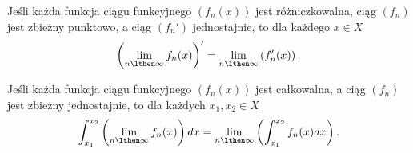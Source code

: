 \begin{theorem}
    Jeśli każda funkcja ciągu funkcyjnego $(f_n(x))$ jest różniczkowalna, ciąg $(f_n)$ jest zbieżny punktowo, a ciąg $(f_n')$ jednostajnie, to dla każdego $x \in X$
    \[ \left(\lim_{n\lthen\infty} f_n(x)\right)' = \lim_{n\lthen\infty} \left(f_n'(x)\right). \]
\end{theorem}

\begin{theorem}
    Jeśli każda funkcja ciągu funkcyjnego $(f_n(x))$ jest całkowalna, a ciąg $(f_n)$ jest zbieżny jednostajnie, to dla każdych $x_1, x_2 \in X$
    \[ \int_{x_1}^{x_2}\left(\lim_{n\lthen\infty} f_n(x)\right) dx = \lim_{n\lthen\infty} \left(\int_{x_1}^{x_2} f_n(x) dx\right). \]
\end{theorem}